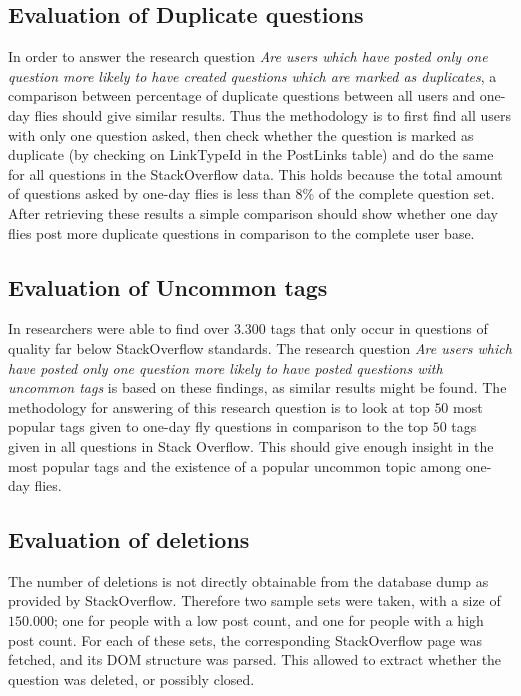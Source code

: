 \documentclass[conference]{IEEEtran}
\begin{document}
\subsection{Evaluation of Duplicate questions}
In order to answer the research question \textit{Are users which have posted only one question more likely to have created questions which are marked as duplicates}, a comparison between percentage of duplicate questions  between all users and one-day flies should give similar results. Thus the methodology is to first find all users with only one question asked, then check whether the question is marked as duplicate (by checking on  LinkTypeId in the PostLinks table) and do the same for all questions in the StackOverflow data. This holds because the total amount of questions asked by one-day flies is less than $8\%$ of the complete question set. After retrieving these results a simple comparison should show whether one day flies post more duplicate questions in comparison to the complete user base.

\subsection{Evaluation of Uncommon tags}
In \cite{correa2014chaff} researchers were able to find over $3.300$ tags that only occur in questions of quality far below StackOverflow standards. The research question \textit{Are users which have posted only one question more likely to have posted questions with uncommon tags} is based on these findings, as similar results might be found. The methodology for answering of this research question is to look at top $50$ most popular tags given to one-day fly questions in comparison to the top $50$ tags given in all questions in Stack Overflow. This should give enough insight in the most popular tags and the existence of a popular uncommon topic among one-day flies.

\subsection{Evaluation of deletions}

The number of deletions is not directly obtainable from the database dump as provided by StackOverflow. Therefore two sample sets were taken, with a size of $150.000$; one for people with a low post count, and one for people with a high post count. For each of these sets, the corresponding StackOverflow page was fetched, and its DOM structure was parsed. This allowed to extract whether the question was deleted, or possibly closed.
\end{document}
